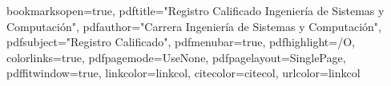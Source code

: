 \usepackage{amsmath,amssymb}             %
\usepackage[left=1.0in,right=1.0in,top=1.0in,bottom=1.0in,includefoot,includehead,headheight=14.04pt]{geometry}
\renewcommand{\baselinestretch}{1.05}

\usepackage[nottoc, notlof, notlot]{tocbibind}
\usepackage{minitoc}
\setcounter{minitocdepth}{2}
\mtcindent=15pt

\usepackage{aecompl}


\usepackage{ifpdf}


\usepackage{color}



\hypersetup
{
bookmarksopen=true,
pdftitle="Registro Calificado Ingeniería de Sistemas y Computación",
pdfauthor="Carrera Ingeniería de Sistemas y Computación", 
pdfsubject="Registro Calificado", %
pdfmenubar=true, %
pdfhighlight=/O, %
colorlinks=true, %
pdfpagemode=UseNone, %
pdfpagelayout=SinglePage, %
pdffitwindow=true, %
linkcolor=linkcol, %
citecolor=citecol, %
urlcolor=linkcol %
}


\setcounter{secnumdepth}{3}
\setcounter{tocdepth}{2}


\newcommand{\pd}[2]{\frac{\partial #1}{\partial #2}}
\def\abs{\operatorname{abs}}
\def\argmax{\operatornamewithlimits{arg\,max}}
\def\argmin{\operatornamewithlimits{arg\,min}}
\def\diag{\operatorname{Diag}}
\newcommand{\eqRef}[1]{(\ref{#1})}

\usepackage{rotating}                    %
\usepackage{fancyhdr}                    %

